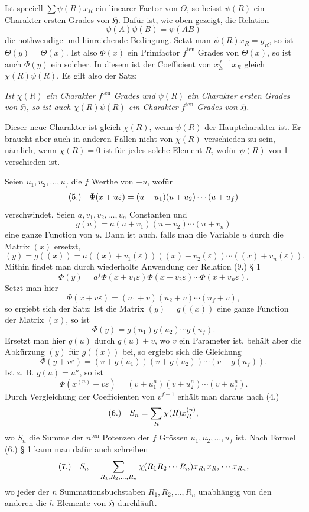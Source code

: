 \documentclass[11pt]{article}
\makeatletter
\newcommand{\Hgrp}{\mathfrak{H}}
\newcommand{\frobtagc}[2]{\[\begin{array}{@{}r@{\quad}c@{}}\textup{(#1)} & \displaystyle #2\end{array}\]}
\makeatother
\begin{document}
Ist speciell $\sum\psi(R)x_R$ ein linearer Factor von $\Theta$, so heisst $\psi(R)$ ein Charakter ersten Grades von $\Hgrp$. Dafür ist, wie oben gezeigt, die Relation
\[
\psi(A)\psi(B)=\psi(AB)
\]
die nothwendige und hinreichende Bedingung. Setzt man $\psi(R)x_R=y_R$, so ist $\Theta(y)=\Theta(x)$. Ist also $\Phi(x)$ ein Primfactor $f^{\mathrm{ten}}$ Grades von $\Theta(x)$, so ist auch $\Phi(y)$ ein solcher. In diesem ist der Coefficient von $x_E^{f-1}x_R$ gleich $\chi(R)\psi(R)$. Es gilt also der Satz:

\emph{Ist $\chi(R)$ ein Charakter $f^{\mathrm{ten}}$ Grades und $\psi(R)$ ein Charakter ersten Grades von $\Hgrp$, so ist auch $\chi(R)\psi(R)$ ein Charakter $f^{\mathrm{ten}}$ Grades von $\Hgrp$.}

Dieser neue Charakter ist gleich $\chi(R)$, wenn $\psi(R)$ der Hauptcharakter ist. Er braucht aber auch in anderen Fällen nicht von $\chi(R)$ verschieden zu sein, nämlich, wenn $\chi(R)=0$ ist für jedes solche Element $R$, wofür $\psi(R)$ von 1 verschieden ist.

Seien $u_1,u_2,\ldots,u_f$ die $f$ Werthe von $-u$, wofür
\frobtagc{5.}{\Phi(x+u\varepsilon)=(u+u_1)(u+u_2)\cdots(u+u_f)}
verschwindet. Seien $a,v_1,v_2,\ldots,v_n$ Constanten und
\[
g(u)=a(u+v_1)(u+v_2)\cdots(u+v_n)
\]
eine ganze Function von $u$. Dann ist auch, falls man die Variable $u$ durch die Matrix $(x)$ ersetzt,
\[
(y)=g((x))=a((x)+v_1(\varepsilon))((x)+v_2(\varepsilon))\cdots((x)+v_n(\varepsilon)).
\]
Mithin findet man durch wiederholte Anwendung der Relation (9.) § 1
\[
\Phi(y)=a^f\Phi(x+v_1\varepsilon)\Phi(x+v_2\varepsilon)\cdots\Phi(x+v_n\varepsilon).
\]
Setzt man hier
\[
\Phi(x+v\varepsilon)=(u_1+v)(u_2+v)\cdots(u_f+v),
\]
so ergiebt sich der Satz: Ist die Matrix $(y)=g((x))$ eine ganze Function der Matrix $(x)$, so ist
\[
\Phi(y)=g(u_1)g(u_2)\cdots g(u_f).
\]
Ersetzt man hier $g(u)$ durch $g(u)+v$, wo $v$ ein Parameter ist, behält aber die Abkürzung $(y)$ für $g((x))$ bei, so ergiebt sich die Gleichung
\[
\Phi(y+v\varepsilon)=(v+g(u_1))(v+g(u_2))\cdots(v+g(u_f)).
\]
Ist z. B. $g(u)=u^n$, so ist
\[
\Phi(x^{(n)}+v\varepsilon)=(v+u_1^n)(v+u_2^n)\cdots(v+u_f^n).
\]
Durch Vergleichung der Coefficienten von $v^{f-1}$ erhält man daraus nach (4.)
\frobtagc{6.}{S_n=\sum_R \chi(R)x_R^{(n)},}
wo $S_n$ die Summe der $n^{\mathrm{ten}}$ Potenzen der $f$ Grössen $u_1,u_2,\ldots,u_f$ ist. Nach Formel (6.) § 1 kann man dafür auch schreiben
\frobtagc{7.}{S_n=\sum_{R_1,R_2,\ldots,R_n}\chi(R_1R_2\cdots R_n)x_{R_1}x_{R_2}\cdots x_{R_n},}
wo jeder der $n$ Summationsbuchstaben $R_1,R_2,\ldots,R_n$ unabhängig von den anderen die $h$ Elemente von $\Hgrp$ durchläuft.
\end{document}
